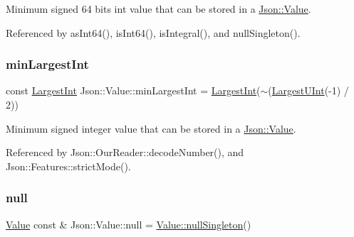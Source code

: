 Minimum signed 64 bits int value that can be stored in a \hyperlink{classJson_1_1Value}{Json\+::\+Value}. 



Referenced by as\+Int64(), is\+Int64(), is\+Integral(), and null\+Singleton().

\mbox{\label{classJson_1_1Value_af91df130daa50dd43d2cd89e6ee67706_af91df130daa50dd43d2cd89e6ee67706}} 
\subsubsection{\texorpdfstring{min\+Largest\+Int}{minLargestInt}}
{\footnotesize\ttfamily const \hyperlink{classJson_1_1Value_a1cbb82642ed05109b9833e49f042ece7_a1cbb82642ed05109b9833e49f042ece7}{Largest\+Int} Json\+::\+Value\+::min\+Largest\+Int = \hyperlink{classJson_1_1Value_a1cbb82642ed05109b9833e49f042ece7_a1cbb82642ed05109b9833e49f042ece7}{Largest\+Int}($\sim$(\hyperlink{classJson_1_1Value_a6682a3684d635e03fc06ba229fa24eec_a6682a3684d635e03fc06ba229fa24eec}{Largest\+U\+Int}(-\/1) / 2))\hspace{0.3cm}{\ttfamily [static]}}



Minimum signed integer value that can be stored in a \hyperlink{classJson_1_1Value}{Json\+::\+Value}. 



Referenced by Json\+::\+Our\+Reader\+::decode\+Number(), and Json\+::\+Features\+::strict\+Mode().

\mbox{\label{classJson_1_1Value_a21ddb05b92c60c7548e928bf371e7d45_a21ddb05b92c60c7548e928bf371e7d45}} 
\subsubsection{\texorpdfstring{null}{null}}
{\footnotesize\ttfamily \hyperlink{classJson_1_1Value}{Value} const  \& Json\+::\+Value\+::null = \hyperlink{classJson_1_1Value_af2f124567acc35d021a424e53ebdfcab_af2f124567acc35d021a424e53ebdfcab}{Value\+::null\+Singleton}()\hspace{0.3cm}{\ttfamily [static]}}



